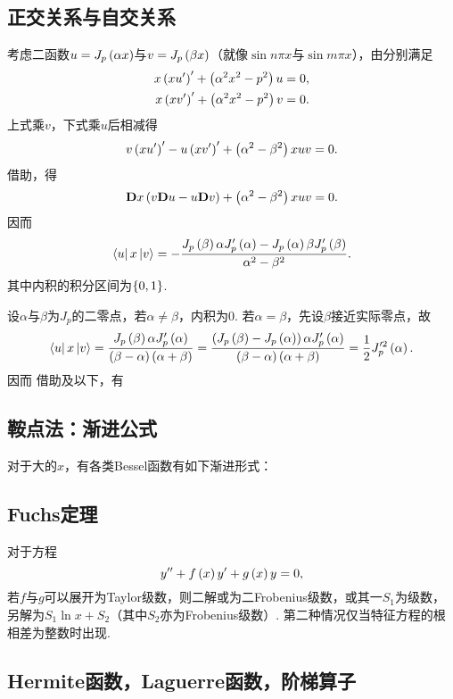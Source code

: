 \documentclass[UTF-8]{ctexart}
\begin{document}
  \subsection{正交关系与自交关系}
  考虑二函数$u=J_p\left(\alpha x\right)$与$v=J_p\left(\beta x\right)$（就像$\sin n\pi x$与$\sin m\pi x$），由分别满足
  \begin{align*}
    x\left(xu'\right)' + \left(\alpha^2 x^2-p^2\right)u = 0, \\
    x\left(xv'\right)' + \left(\alpha^2 x^2-p^2\right)v = 0.
  \end{align*}
  上式乘$v$，下式乘$u$后相减得
  \[ v\left(xu'\right)' - u\left(xv'\right)' + \left(\alpha^2-\beta^2\right)xuv = 0. \]
  借助，得
  \[ \mathbf{D} x \left(v\mathbf{D} u - u \mathbf{D} v\right) + \left(\alpha^2-\beta^2\right)xuv = 0. \]
  因而
  \[ \bra{u} x \ket{v} = -\frac{J_p\left(\beta\right)\alpha J'_p\left(\alpha\right) - J_p\left(\alpha\right)\beta J'_p\left(\beta\right)}{\alpha^2-\beta^2}.  \]
  其中内积的积分区间为$\left\{0,1\right\}$.
  \par
  设$\alpha$与$\beta$为$J_p$的二零点，若$\alpha \ne \beta$，内积为$0$. 若$\alpha = \beta$，先设$\beta$接近实际零点，故
  \[ \bra{u} x \ket{v} = \frac{J_p\left(\beta\right)\alpha J'_p\left(\alpha\right)}{\left(\beta-\alpha\right)\left(\alpha+\beta\right)} = \frac{\left(J_p\left(\beta\right)-J_p\left(\alpha\right)\right)\alpha J'_p\left(\alpha\right)}{\left(\beta-\alpha\right)\left(\alpha+\beta\right)} = \frac{1}{2} J'^2_p\left(\alpha\right). \]
  因而
  借助及以下，有
  \subsection{鞍点法：渐进公式}
  对于大的$x$，有各类Bessel函数有如下渐进形式：
  \subsection{Fuchs定理}
  对于方程
  \[ y''+f\left(x\right)y'+g\left(x\right)y=0, \]
  若$f$与$g$可以展开为Taylor级数，则二解或为二Frobenius级数，或其一$S_1$为级数，另解为$S_1\ln x+S_2$（其中$S_2$亦为Frobenius级数）. 第二种情况仅当特征方程的根相差为整数时出现.
  \subsection{Hermite函数，Laguerre函数，阶梯算子}
\end{document}
